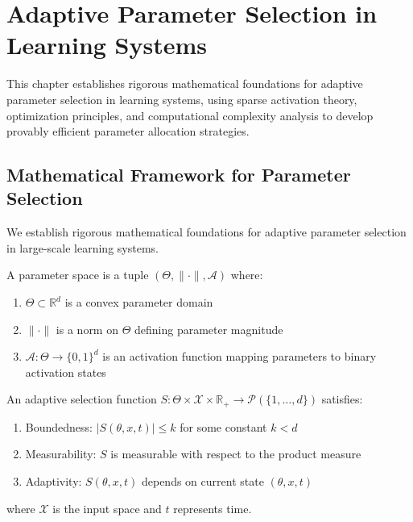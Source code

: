 \chapter{Adaptive Parameter Selection in Learning Systems}

\begin{tcolorbox}[colback=DarkSkyBlue!5!white,colframe=DarkSkyBlue!75!black,title=Chapter Summary]
This chapter establishes rigorous mathematical foundations for adaptive parameter selection in learning systems, using sparse activation theory, optimization principles, and computational complexity analysis to develop provably efficient parameter allocation strategies.
\end{tcolorbox}

\section{Mathematical Framework for Parameter Selection}

We establish rigorous mathematical foundations for adaptive parameter selection in large-scale learning systems.

\begin{definition}
\label{def:parameter_space}
A parameter space is a tuple $(\Theta, \|\cdot\|, \mathcal{A})$ where:
\begin{enumerate}
\item $\Theta \subset \mathbb{R}^d$ is a convex parameter domain
\item $\|\cdot\|$ is a norm on $\Theta$ defining parameter magnitude
\item $\mathcal{A}: \Theta \to \{0,1\}^d$ is an activation function mapping parameters to binary activation states
\end{enumerate}
\end{definition}

\begin{definition}
\label{def:adaptive_selection}
An adaptive selection function $S: \Theta \times \mathcal{X} \times \mathbb{R}_+ \to \mathcal{P}(\{1,\ldots,d\})$ satisfies:
\begin{enumerate}
\item Boundedness: $|S(\theta, x, t)| \leq k$ for some constant $k < d$
\item Measurability: $S$ is measurable with respect to the product measure
\item Adaptivity: $S(\theta, x, t)$ depends on current state $(\theta, x, t)$
\end{enumerate}
where $\mathcal{X}$ is the input space and $t$ represents time.
\end{definition}

